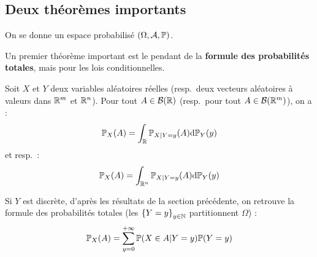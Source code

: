 \documentclass[../integ-proba.tex]{subfiles}
\begin{document}
    \subsection{Deux théorèmes importants}

    On se donne un espace probabilisé $\left( \Omega, \mathcal{A}, \mathbb{P} \right)$.

    Un premier théorème important est le pendant de la \textbf{formule des probabilités totales}, mais pour les lois conditionnelles.

    \begin{thm}
        Soit $X$ et $Y$ deux variables aléatoires réelles (resp.\ deux vecteurs aléatoires à valeurs dans $\mathbb{R}^m$ et $\mathbb{R}^n$).
        Pour tout $A \in \mathcal{B}(\mathbb{R})$ (resp.\ pour tout $A \in \mathcal{B}(\mathbb{R}^m)$), on a :
        \begin{displaymath}
            \mathbb{P}_X(A) = \int_{\mathbb{R}} \mathbb{P}_{X | Y = y} (A) \textnormal{d} \mathbb{P}_Y(y)
        \end{displaymath}
        et resp.\ :
        \begin{displaymath}
            \mathbb{P}_X(A) = \int_{\mathbb{R}^n} \mathbb{P}_{X | Y = y} (A) \textnormal{d} \mathbb{P}_Y(y)
        \end{displaymath}
    \end{thm}

    \begin{rem}
        Si $Y$ est discrète, d'après les résultats de la section précédente, on retrouve la formule des probabilités totales (les $\left\{ Y = y \right\}_{y \in \mathbb{N}}$ partitionnent $\Omega$) :
        \begin{displaymath}
            \mathbb{P}_X(A) = \sum_{y = 0}^{+ \infty} \mathbb{P}(X \in A | Y = y) \mathbb{P}(Y = y)
        \end{displaymath}
    \end{rem}
\end{document}
